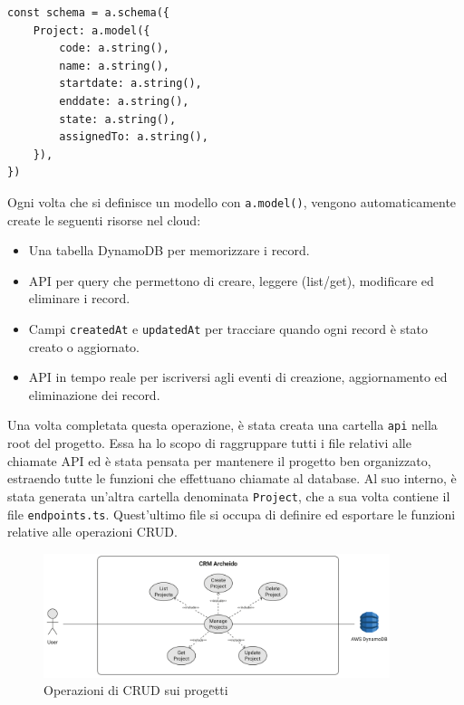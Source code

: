 \documentclass[target=bach,aauheader=,style=]{thud}
\begin{document}
\begin{lstlisting}[caption=Parte del file \texttt{amplify/data/resource.ts}]
const schema = a.schema({
    Project: a.model({
        code: a.string(),
        name: a.string(),
        startdate: a.string(),
        enddate: a.string(),
        state: a.string(),
        assignedTo: a.string(),
    }),
})
\end{lstlisting}

\noindent Ogni volta che si definisce un modello con \texttt{a.model()}, vengono automaticamente create le seguenti risorse nel cloud:
\begin{itemize}
    \item Una tabella DynamoDB per memorizzare i record.
    \item API per query che permettono di creare, leggere (list/get), modificare ed eliminare i record.
    \item Campi \texttt{createdAt} e \texttt{updatedAt} per tracciare quando ogni record è stato creato o aggiornato.
    \item API in tempo reale per iscriversi agli eventi di creazione, aggiornamento ed eliminazione dei record.
\end{itemize}
\noindent Una volta completata questa operazione, è stata creata una cartella \texttt{api} nella root del progetto. Essa ha lo scopo di raggruppare tutti i file relativi alle chiamate API ed è stata pensata per mantenere il progetto ben organizzato, estraendo tutte le funzioni che effettuano chiamate al database. Al suo interno, è stata generata un'altra cartella denominata \texttt{Project}, che a sua volta contiene il file \texttt{endpoints.ts}. Quest'ultimo file si occupa di definire ed esportare le funzioni relative alle operazioni CRUD.

\begin{figure}[H]
    \centering
    \includegraphics[width=0.9\textwidth]{img/diagrammi/use_case_manage_projects.pdf} 
    \caption{Operazioni di CRUD sui progetti}
    \label{crud_use_case}
\end{figure}
\end{document}
